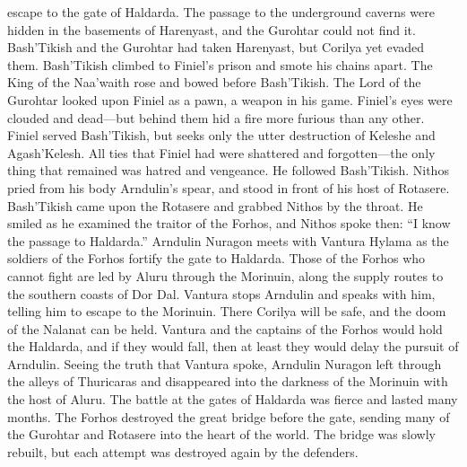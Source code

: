 \documentclass[smalldemyvopaper,11pt,twoside,onecolumn,openright,extrafontsizes]{memoir}
\begin{document}
{{escape to the gate of Haldarda. The passage to the underground caverns were hidden in the basements of Harenyast, and the Gurohtar could not find it.
	Bash’Tikish and the Gurohtar had taken Harenyast, but Corilya yet evaded them. Bash’Tikish climbed to Finiel’s prison and smote his chains apart. The King of the Naa’waith rose and bowed before Bash’Tikish. The Lord of the Gurohtar looked upon Finiel as a pawn, a weapon in his game. Finiel’s eyes were clouded and dead—but behind them hid a fire more furious than any other. Finiel served Bash’Tikish, but seeks only the utter destruction of Keleshe and Agash’Kelesh. All ties that Finiel had were shattered and forgotten—the only thing that remained was hatred and vengeance. He followed Bash’Tikish. Nithos pried from his body Arndulin’s spear, and stood in front of his host of Rotasere. Bash’Tikish came upon the Rotasere and grabbed Nithos by the throat. He smiled as he examined the traitor of the Forhos, and Nithos spoke then: “I know the passage to Haldarda.”
	Arndulin Nuragon meets with Vantura Hylama as the soldiers of the Forhos fortify the gate to Haldarda. Those of the Forhos who cannot fight are led by Aluru through the Morinuin, along the supply routes to the southern coasts of Dor Dal.
	Vantura stops Arndulin and speaks with him, telling him to escape to the Morinuin. There Corilya will be safe, and the doom of the Nalanat can be held. Vantura and the captains of the Forhos would hold the Haldarda, and if they would fall, then at least they would delay the pursuit of Arndulin. Seeing the truth that Vantura spoke, Arndulin Nuragon left through the alleys of Thuricaras and disappeared into the darkness of the Morinuin with the host of Aluru. The battle at the gates of Haldarda was fierce and lasted many months. The Forhos destroyed the great bridge before the gate, sending many of the Gurohtar and Rotasere into the heart of the world. The bridge was slowly rebuilt, but each attempt was destroyed again by the defenders.

}}
\end{document}
